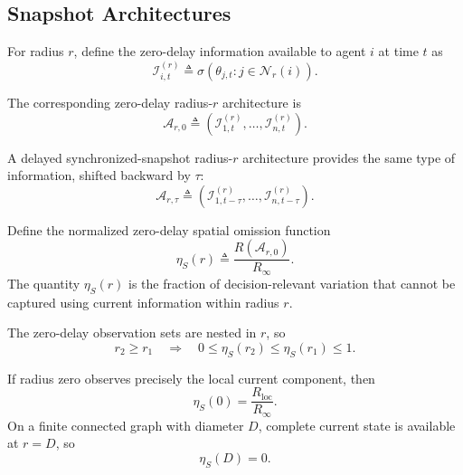 \documentclass[11pt]{article}
\begin{document}
\subsection{Snapshot Architectures}
\label{subsec:joint_spatiotemporal}

For radius $r$, define the zero-delay information available to agent $i$ at
time $t$ as
\begin{equation}
    \mathcal{I}_{i,t}^{(r)}
    \triangleq
    \sigma\!\left(
        \theta_{j,t}:j\in\mathcal{N}_r(i)
    \right).
    \label{eq:zero_delay_radius_information}
\end{equation}

The corresponding zero-delay radius-$r$ architecture is
\begin{equation}
    \mathcal{A}_{r,0}
    \triangleq
    \left(
        \mathcal{I}_{1,t}^{(r)},
        \ldots,
        \mathcal{I}_{n,t}^{(r)}
    \right).
    \label{eq:zero_delay_radius_architecture}
\end{equation}

A delayed synchronized-snapshot radius-$r$ architecture provides the same type
of information, shifted backward by $\tau$:
\begin{equation}
    \mathcal{A}_{r,\tau}
    \triangleq
    \left(
        \mathcal{I}_{1,t-\tau}^{(r)},
        \ldots,
        \mathcal{I}_{n,t-\tau}^{(r)}
    \right).
    \label{eq:delayed_radius_architecture}
\end{equation}

Define the normalized zero-delay spatial omission function
\begin{equation}
    \eta_S(r)
    \triangleq
    \frac{
        R(\mathcal{A}_{r,0})
    }{
        R_\infty
    }.
    \label{eq:eta_S_definition}
\end{equation}
The quantity $\eta_S(r)$ is the fraction of decision-relevant variation that
cannot be captured using current information within radius $r$.

The zero-delay observation sets are nested in $r$, so
\begin{equation}
r_2\ge r_1\quad\Longrightarrow\quad
0\le\eta_S(r_2)\le\eta_S(r_1)\le1.
\label{eq:eta_S_monotone}
\end{equation}

If radius zero observes precisely the local current component, then
\begin{equation}
    \eta_S(0)
    =
    \frac{R_{\mathrm{loc}}}{R_\infty}.
    \label{eq:eta_S_zero}
\end{equation}
On a finite connected graph with diameter $D$, complete current state is available at
$r=D$, so
\begin{equation}
    \eta_S(D)=0.
    \label{eq:eta_S_diameter}
\end{equation}
\end{document}
